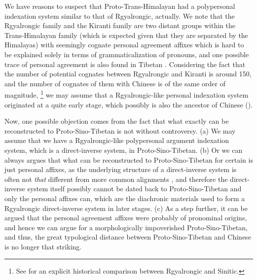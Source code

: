 \documentclass[UTF8, a4paper, oneside, scheme=plain, 12pt]{ctexrep}
\begin{document}
We have reasons to suspect that Proto-Trans-Himalayan had a polypersonal indexation system similar to that of Rgyalrongic,  actually.
We note that the Rgyalrongic family and the Kiranti family are two distant groups within the Trans-Himalayan family
(which is expected given that they are separated by the Himalayas)
with seemingly cognate personal agreement affixes
which is hard to be explained solely in terms of grammaticalization of pronouns,
and one possible trace of personal agreement is also found in Tibetan
\citep{jacques2012agreement,jacques2010possible,jacques2016tangut}.
Considering the fact that the number of potential cognates between Rgyalrongic and Kiranti is around 150,
and the number of cognates of them with Chinese is of the same order of magnitude,%
\footnote{
    See \citet{shuya2019study} for an explicit historical comparison between Rgyalrongic and Sinitic.
}
we may assume that a Rgyalrongic-like personal indexation system originated at a quite early stage,
which possibly is also the ancestor of Chinese
(\citealt{jacques2012agreement}).


Now, one possible objection comes from the fact that what exactly can be reconstructed to Proto-Sino-Tibetan is not without controversy.
(a) We may assume that we have a Rgyalrongic-like polypersonal argument indexation system, which is a direct-inverse system, in Proto-Sino-Tibetan.
(b) Or we can always argues that
what can be reconstructed to Proto-Sino-Tibetan for certain is just personal affixes,
as the underlying structure of a direct-inverse system is often not \emph{that}
different from more common alignments \citep{oxford2017inverse},
and therefore the direct-inverse system itself possibly cannot be dated back to Proto-Sino-Tibetan
and only the personal affixes can,
which are the diachronic materials used to form a Rgyalrongic direct-inverse system in later stages.
(c) As a step further, it can be argued that the personal agreement affixes
were probably of pronominal origins, 
and hence we can argue for a morphologically impoverished Proto-Sino-Tibetan,
and thus, the great typological distance between Proto-Sino-Tibetan and Chinese is no longer that striking.
\end{document}
